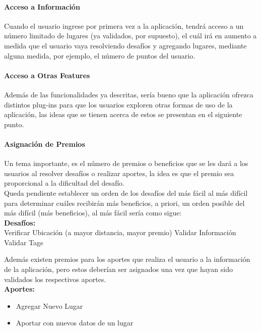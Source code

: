 \documentclass[10pt,letterpaper]{article}
\begin{document}
\paragraph{Acceso a Información}

Cuando el usuario ingrese por primera vez a la aplicación, tendrá acceso a un número limitado de lugares (ya validados, por supuesto), el cuál irá en aumento a medida que el usuario vaya resolviendo desafíos y agregando lugares, mediante alguna medida, por ejemplo, el número de puntos del usuario.

\paragraph{Acceso a Otras Features}

Además de las funcionalidades ya descritas, sería bueno que la aplicación ofrezca distintos plug-ins para que los usuarios exploren otras formas de uso de la aplicación, las ideas que se tienen acerca de estos se presentan en el siguiente punto.

\paragraph{Asignación de Premios}

Un tema importante, es el número de premios o beneficios que se les dará a los usuarios al resolver desafíos o realizar aportes, la idea es que el premio sea proporcional a la dificultad del desafío.\\

Queda pendiente establecer un orden de los desafíos del más fácil al más difícil para determinar cuáles recibirán más beneficios, a priori, un orden posible del más difícil (más beneficios), al más fácil sería como sigue:\\

\textbf{Desafíos:}\\

Verificar Ubicación (a mayor distancia, mayor premio)
Validar Información
Validar Tags

Además existen premios para los aportes que realiza el usuario a la información de la aplicación, pero estos deberían ser asignados una vez que hayan sido validados los respectivos aportes.\\

\textbf{Aportes:}\\

\begin{itemize}
\item Agregar Nuevo Lugar
\item Aportar con nuevos datos de un lugar
\end{itemize}
\end{document}
